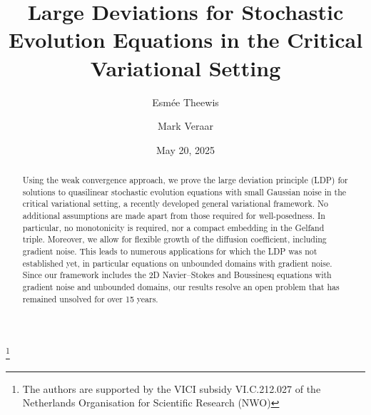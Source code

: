 \documentclass{amsart}
\newcommand{\<}{\langle}
\newcommand{\?}{\rangle}
\theoremstyle{plain}
\theoremstyle{remark}
\theoremstyle{plain}
\numberwithin{equation}{section}
\begin{document}
\author[E. S. Theewis]{Esm\'ee Theewis}
\address[E. S. Theewis]{Delft Institute of Applied Mathematics\\
Delft University of Technology \\ P.O. Box 5031\\ 2600 GA Delft\\The
Netherlands}

\author[M. C. Veraar]{Mark Veraar}
\address[M. C. Veraar]{Delft Institute of Applied Mathematics\\
Delft University of Technology \\ P.O. Box 5031\\ 2600 GA Delft\\The
Netherlands}


\thanks{The authors are supported by the VICI subsidy VI.C.212.027 of the Netherlands Organisation for Scientific Research (NWO)}

\date{May 20, 2025}

\title[Large Deviations for Stochastic Evolution Equations]{Large Deviations for Stochastic Evolution Equations in the Critical Variational Setting}




\begin{abstract}
Using the weak convergence approach, we prove the large deviation principle (LDP) for solutions to quasilinear stochastic evolution equations with small Gaussian noise in the critical variational setting, a recently developed general variational framework. No additional assumptions are made apart from those required for well-posedness. In particular, no monotonicity is required, nor a compact embedding in the Gelfand triple. Moreover, we allow for flexible growth of the diffusion coefficient, including gradient noise. This leads to numerous applications for which the LDP was not established yet, in particular equations on unbounded domains with gradient noise. 
Since our framework includes the 2D Navier--Stokes and Boussinesq equations with gradient noise and unbounded domains, our results resolve an open problem that has remained unsolved for over 15 years.  
\end{abstract}
\end{document}
